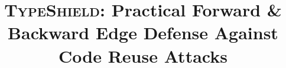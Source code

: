 \documentclass[conference]{IEEEtran}
\theoremstyle{definition}
\begin{document}

\title{\textsc{TypeShield}: Practical Forward \& Backward Edge Defense Against Code Reuse Attacks}






\thispagestyle{plain}
\pagestyle{plain}

\thispagestyle{empty}

\maketitle
\end{document}
